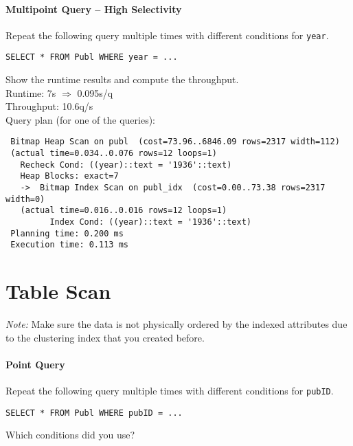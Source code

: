 \documentclass[11pt]{scrartcl}
\begin{document}
\paragraph{Multipoint Query -- High Selectivity}

Repeat the following query multiple times with different conditions for {\tt year}.

{\small
\begin{verbatim}
SELECT * FROM Publ WHERE year = ...
\end{verbatim}
}

\noindent
\condC

\smallskip\noindent
Show the runtime results and compute the throughput.\\
Runtime: 7s $\Rightarrow$ 0.095s/q\\
Throughput: 10.6q/s\\

\smallskip\noindent
Query plan (for one of the queries):
{\small
\begin{verbatim}
 Bitmap Heap Scan on publ  (cost=73.96..6846.09 rows=2317 width=112)
 (actual time=0.034..0.076 rows=12 loops=1)
   Recheck Cond: ((year)::text = '1936'::text)
   Heap Blocks: exact=7
   ->  Bitmap Index Scan on publ_idx  (cost=0.00..73.38 rows=2317 width=0)
   (actual time=0.016..0.016 rows=12 loops=1)
         Index Cond: ((year)::text = '1936'::text)
 Planning time: 0.200 ms
 Execution time: 0.113 ms
\end{verbatim}
}


\section{Table Scan}

\noindent \emph{Note:} Make sure the data is not physically ordered by
the indexed attributes due to the clustering index that you created
before.

\paragraph{Point Query}

Repeat the following query multiple times with different conditions for {\tt pubID}.

{\small
\begin{verbatim}
SELECT * FROM Publ WHERE pubID = ...
\end{verbatim}
}

\noindent
Which conditions did you use?\\
\condA[500]
\end{document}
